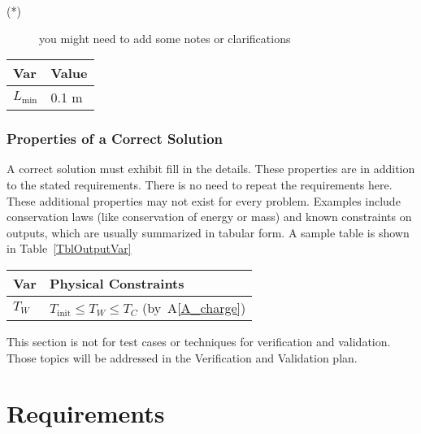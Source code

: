 \documentclass[12pt]{article}
\newcommand{\aref}[1]{A\ref{#1}}
\begin{document}
\noindent 
\begin{description}
\item[(*)] you might need to add some notes or clarifications
\end{description}

\begin{table}[!h]
\caption{Specification Parameter Values} \label{TblSpecParams}
\renewcommand{\arraystretch}{1.2}
\noindent \begin{longtable*}{l l} 
  \toprule
  \textbf{Var} & \textbf{Value} \\
  \midrule 
  $L_\text{min}$ & 0.1 \si{\metre}\\
  \bottomrule
\end{longtable*}
\end{table}

\subsubsection{Properties of a Correct Solution} \label{sec_CorrectSolution}

A correct solution must exhibit fill in the details.  These properties are in
addition to the stated requirements.  There is no need to repeat the
requirements here.  These additional properties may not exist for every problem.
Examples include conservation laws (like conservation of energy or mass) and
known constraints on outputs, which are usually summarized in tabular form.  A
sample table is shown in Table~\ref{TblOutputVar}

\begin{table}[!h]
\caption{Output Variables} \label{TblOutputVar}
\renewcommand{\arraystretch}{1.2}
\noindent \begin{longtable*}{l l} 
  \toprule
  \textbf{Var} & \textbf{Physical Constraints} \\
  \midrule 
  $T_W$ & $T_\text{init} \leq T_W \leq T_C$ (by~\aref{A_charge})
  \\
  \bottomrule
\end{longtable*}
\end{table}

This section is not for test cases or techniques for verification and
validation.  Those topics will be addressed in the Verification and Validation
plan.

\section{Requirements}
\end{document}
